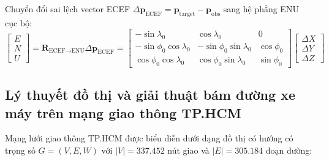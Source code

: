 Chuyển đổi sai lệch vector ECEF $\Delta\mathbf{p}_{\text{ECEF}} = \mathbf{p}_{\text{target}} - \mathbf{p}_{\text{obs}}$ sang hệ phẳng ENU cục bộ:
\begin{equation}
\begin{bmatrix} E \\ N \\ U \end{bmatrix} = \mathbf{R}_{\text{ECEF}\to\text{ENU}} \Delta\mathbf{p}_{\text{ECEF}} = \begin{bmatrix}
-\sin\lambda_0 & \cos\lambda_0 & 0 \\
-\sin\phi_0 \cos\lambda_0 & -\sin\phi_0 \sin\lambda_0 & \cos\phi_0 \\
\cos\phi_0 \cos\lambda_0 & \cos\phi_0 \sin\lambda_0 & \sin\phi_0
\end{bmatrix} \begin{bmatrix} \Delta X \\ \Delta Y \\ \Delta Z \end{bmatrix}
\label{eq:ecef-to-enu-rotation-matrix-w15}
\end{equation}

\subsection{Lý thuyết đồ thị và giải thuật bám đường xe máy trên mạng giao thông TP.HCM}

\hspace{0.5cm} Mạng lưới giao thông TP.HCM được biểu diễn dưới dạng đồ thị có hướng có trọng số $G = (V, E, W)$ với $|V| = 337.452$ nút giao và $|E| = 305.184$ đoạn đường:


